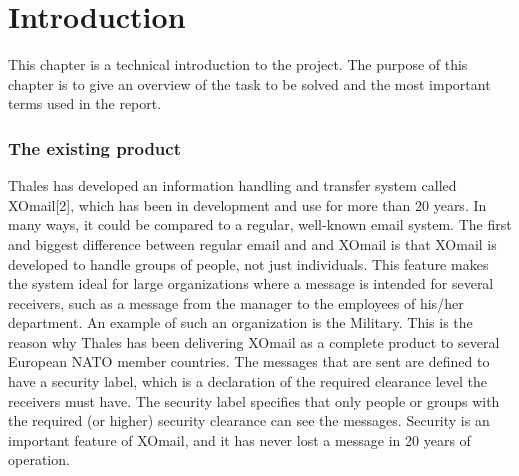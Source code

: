 \chapter{Introduction}

This chapter is a technical introduction to the project. The purpose of this chapter is to give an overview of the task to be solved and the most important terms used in the report.

\subsection*{The existing product}
Thales has developed an information handling and transfer system called XOmail[2], which has been in development and use for more than 20 years. In many ways, it could be compared to a regular, well-known email system. The first and biggest difference between regular email and and XOmail is that XOmail is developed to handle groups of people, not just individuals. This feature makes the system ideal for large organizations where a message is intended for several receivers, such as a message from the manager to the employees of his/her department. An example of such an organization is the Military. This is the reason why Thales has been delivering XOmail as a complete product to several European NATO member countries.  
\newline
\newline
The messages that are sent are defined to have a security label, which is a declaration of the required clearance level the receivers must have. The security label specifies that only people or groups with the required (or higher) security clearance can see the messages. Security is an important feature of XOmail, and it has never lost a message in 20 years of operation. 

